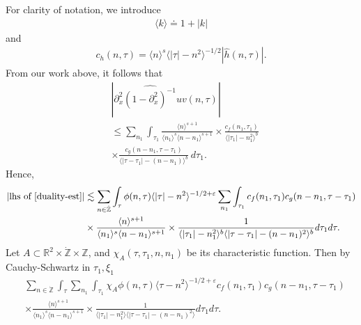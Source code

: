 \documentclass[12pt,reqno]{amsart}
\numberwithin{equation}{section}  %
\renewcommand{\cref}{\Cref}
\newcommand{\rr}{\mathbb{R}}
\newcommand{\zz}{\mathbb{Z}}
\newcommand{\zzdot}{\dot{\zz}}
\newcommand{\wh}{\widehat}
\newcommand{\p}{\partial}
\newcommand{\ee}{\varepsilon}
\begin{document}
For clarity of notation, we introduce 
\begin{equation*}
\begin{split}
\langle k \rangle \doteq 1 + |k|
\end{split}
\end{equation*}
and
\begin{equation*}
\begin{split}
c_h(n, \tau) =
\langle n \rangle ^s \langle |\tau| - n^{2} \rangle^{-1/2} | \wh{h}\left( n, \tau \right) |.
\end{split}
\end{equation*}
From our work above, it follows that 
\begin{equation}
\label{convo-est-starting-pnt}
\begin{split}
&  | \wh{\p_{x}^{2}(1 - \p_{x}^{2})^{-1}uv}\left( 
n, \tau \right) |
\\
& \le  
\sum_{n_{1}} \int_{\tau_{1}} \frac{\langle n \rangle^{s+1}}{\langle n_1 \rangle^s
\langle n - n_1 \rangle^{s+1}} 
\times \frac{c_f(n_1, \tau_1)}{\langle |\tau_1| - n_1^{2} \rangle^{b}}
\\
& \times
\frac{c_g(n - n_1, \tau - \tau_1 )}{\langle |\tau - \tau_1| - (n - n_1)
\rangle^{b}}\ d \tau_1.
\end{split}
\end{equation}
Hence, 
\begin{equation}
\label{pre-fubini-int-form}
\begin{split}
|\text{lhs of} \ \cref{duality-est}|
& \lesssim \sum_{n \in \zzdot} \int_{\tau} \phi(n, \tau)\langle | \tau | - n^{2} \rangle^{-1/2+\ee}  
\sum_{n_{1}}
\int_{\tau_{1}} c_f(n_1, \tau_1)
c_g(n - n_1, \tau - \tau_1 )
\\
& \times \frac{\langle n \rangle ^{s+1}}{\langle n_{1} \rangle ^{s} \langle
n-n_{1} \rangle ^{s+1}} \times \frac{1}{\langle |\tau_{1}|-n_{1}^{2} \rangle^{b}\langle | \tau -
\tau_{1}|-(n - n_{1})^{2}
\rangle^{b}} d \tau_1 d \tau.
\end{split}
\end{equation}
Let $A \subset \rr^{2} \times \zzdot \times \zz$, and $\chi_{A}(\tau, \tau_{1}, n, n_{1})$
be its
characteristic function. Then by Cauchy-Schwartz in
$\tau_{1}, \xi_{1}$
\begin{equation*}
\begin{split}
& \sum_{n \in \zzdot} \int_{\tau}   \sum_{n_{1}}
\int_{\tau_{1}} \chi_{A}
\phi(n, \tau)  \langle \tau - n^{2} \rangle^{-1/2+\ee}
c_f(n_1, \tau_1)
c_g(n - n_1, \tau - \tau_1 )
\\
& \times 
\frac{\langle n \rangle ^{s+1}}{\langle n_{1} \rangle ^{s} \langle
n-n_{1} \rangle ^{s+1}} 
\times \frac{1}{\langle |\tau_{1}|-n_{1}^{2} \rangle\langle | \tau -
\tau_{1}|-(n - n_{1})^{2}
\rangle} d \tau_1 d \tau.
\end{split}
\end{equation*}
\end{document}
